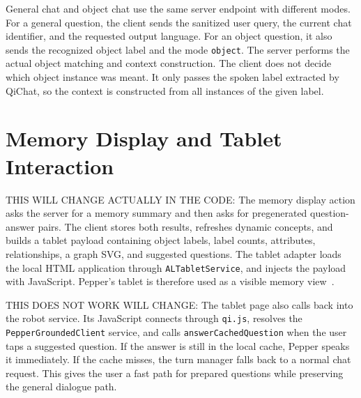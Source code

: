 General chat and object chat use the same server endpoint with different modes. For a general question, the client sends the sanitized user query, the current chat identifier, and the requested output language. For an object question, it also sends the recognized object label and the mode \texttt{object}. The server performs the actual object matching and context construction. The client does not decide which object instance was meant. It only passes the spoken label extracted by QiChat, so the context is constructed from all instances of the given label.

\section{Memory Display and Tablet Interaction}\label{sec:client-tablet}

THIS WILL CHANGE ACTUALLY IN THE CODE: The memory display action asks the server for a memory summary and then asks for pregenerated question-answer pairs. The client stores both results, refreshes dynamic concepts, and builds a tablet payload containing object labels, label counts, attributes, relationships, a graph SVG, and suggested questions. The tablet adapter loads the local HTML application through \texttt{ALTabletService}, and injects the payload with JavaScript. Pepper's tablet is therefore used as a visible memory view~\cite{softbank_peppers_tablet_2026}.

THIS DOES NOT WORK WILL CHANGE: The tablet page also calls back into the robot service. Its JavaScript connects through \texttt{qi.js}, resolves the \texttt{PepperGroundedClient} service, and calls \texttt{answerCachedQuestion} when the user taps a suggested question. If the answer is still in the local cache, Pepper speaks it immediately. If the cache misses, the turn manager falls back to a normal chat request. This gives the user a fast path for prepared questions while preserving the general dialogue path.



